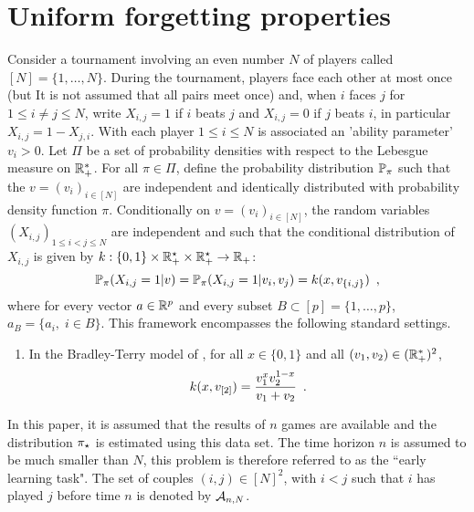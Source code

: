 \section{Uniform forgetting properties}
\label{sec:graphical:model}
Consider a tournament involving an even number $N$ of players called $[N]=\{1,\ldots,N\}$. 
During the tournament, players face each other at most once (but It is not assumed that all pairs meet once) and, when $i$ faces $j$ for $1\le i \neq j\le N$, write $X_{i,j}=1$ if $i$ beats $j$ and $X_{i,j}=0$ if $j$ beats $i$, in particular $X_{i,j}=1-X_{j,i}$. With each player $1\le i\le N$ is associated an 'ability parameter' $v_i>0$. Let $\Pi$ be a set of probability densities with respect to the Lebesgue measure on $\mathbb{R}_+^*$. For all $\pi\in\Pi$, define the probability distribution $\mathbb{P}_\pi$ such that the $v=(v_i)_{i\in[N]}$ are independent and identically distributed with probability density function $\pi$. Conditionally on $v=(v_i)_{i\in[N]}$, the random variables $(X_{i,j})_{1\le i<j\le N}$ are independent and such that the conditional distribution of $X_{i,j}$ is given by $k: \{0,1\}\times\mathbb{R}_+^\star\times\mathbb{R}_+^\star\to\mathbb{R}_+$:
\begin{equation}
\label{eq:conditional:ind}
\mathbb{P}_{\pi}(X_{i,j}=1|v) = \mathbb{P}_{\pi}(X_{i,j}=1|v_i,v_j)=k(x,v_{\{i,j\}})\enspace,
\end{equation}
where for every vector $a\in \mathbb{R}^p$ and every subset $B\subset [p]=\{1,\ldots,p\}$, $a_{B}=\{a_i,\;i\in B\}$. 
This framework encompasses the following standard settings.
\begin{enumerate}[-]
\item In the Bradley-Terry model of \cite{bradley:terry:1952,zemerlo:1929}, for all $x\in \{0,1\}$ and all $(v_1,v_2)\in(\mathbb{R}_+^*)^2$, 
\begin{equation}
\label{eq:def:condlik}
k(x,v_{[2]})=\frac{v_1^xv_2^{1-x}}{v_1+v_2}\enspace.
\end{equation}
\end{enumerate}  
In this paper, it is assumed that the results of $n$ games are available and the distribution $\pi_{\star}$ is estimated using this data set. The time horizon $n$ is assumed to be much smaller than $N$, this problem is therefore referred to as the ``early learning task". The set of couples $(i,j)\in[N]^2$, with $i<j$ such that $i$ has played $j$ before time $n$ is denoted by $\mathcal{A}_{n,N}$.%


